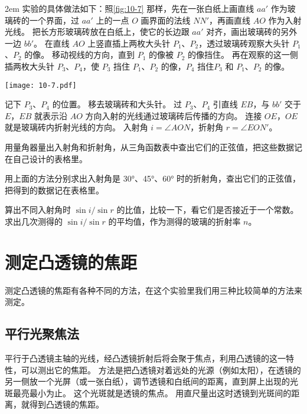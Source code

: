 \medskip\noindent
\begin{minipage}{0.5\linewidth}\parindent2em
实验的具体做法如下：照\cref{fig:10-7} 那样，先在一张白纸上画直线 $aa'$ 作为玻璃砖的一个界面，过 $aa'$ 上的一点 $O$ 画界面的法线 $NN'$，再画直线 $AO$ 作为入射光线。
把长方形玻璃砖放在白纸上，使它的长边跟 $aa'$ 对齐，画出玻璃砖的另外一边 $bb'$。
在直线 $AO$ 上竖直插上两枚大头针 $P_1$、$P_2$，透过玻璃砖观察大头针 $P_1$、$P_2$ 的像。
移动视线的方向，直到 $P_1$ 的像被 $P_2$ 的像挡住。
再在观察的这一侧插两枚大头针 $P_3$、$P_4$，使 $P_3$ 挡住 $P_1$、$P_2$ 的像，$P_4$ 挡住$P_3$ 和 $P_1$、$P_2$ 的像。
\end{minipage}\hfill
\begin{minipage}{0.45\linewidth}\centering
  \begin{figurehere}
    \texttt{[image: 10-7.pdf]}
    \caption{}\label{fig:10-7}
  \end{figurehere}
\end{minipage}

\medskip
记下 $P_3$、$P_4$ 的位置。
移去玻璃砖和大头针。
过 $P_3$、$P_4$ 引直线 $EB$，与 $bb'$ 交于 $E$，$EB$ 就表示沿 $AO$ 方向入射的光线通过玻璃砖后传播的方向。
连接 $OE$，$OE$ 就是玻璃砖内折射光线的方向。
入射角 $i=\angle AON$，折射角 $r=\angle EON'$。

用量角器量出入射角和折射角，从三角函数表中查出它们的正弦值，把这些数据记在自己设计的表格里。

用上面的方法分别求出入射角是 \ang{30}、\ang{45}、\ang{60} 时的折射角，查出它们的正弦值，把得到的数据记在表格里。

算出不同入射角时 $\sin i/\sin r$ 的比值，比较一下，看它们是否接近于一个常数。
求出几次测得的 $\sin i/\sin r$ 的平均值，作为测得的玻璃的折射率 $n$。

\section{测定凸透镜的焦距}
测定凸透镜的焦距有各种不同的方法，在这个实验里我们用三种比较简单的方法来测定。

\subsection{平行光聚焦法}

平行于凸透镜主轴的光线，经凸透镜折射后将会聚于焦点，利用凸透镜的这一特性，可以测出它的焦距。
方法是把凸透镜对着远处的光源（例如太阳），在透镜的另一侧放一个光屏（或一张白纸），调节透镜和白纸间的距离，直到屏上出现的光斑最亮最小为止。
这个光斑就是透镜的焦点。
用直尺量出这时透镜到光斑间的距离，就得到凸透镜的焦距。

